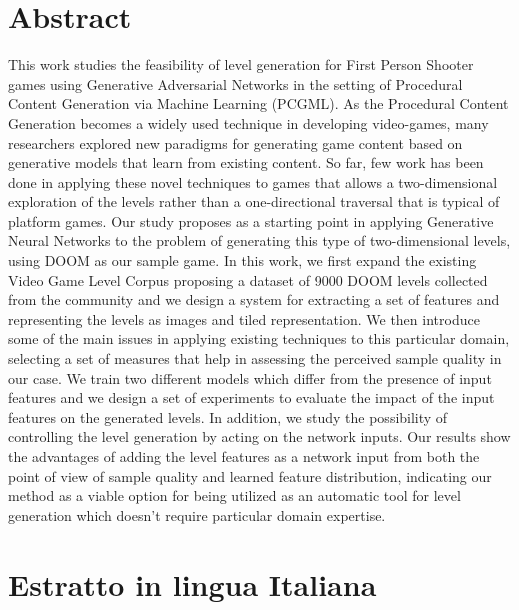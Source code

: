 \chapter*{Abstract}
%
This work studies the feasibility of level generation for First Person Shooter games using Generative Adversarial Networks in the setting of Procedural Content Generation via Machine Learning (PCGML).
As the Procedural Content Generation becomes a widely used technique in developing video-games, many researchers explored new paradigms for generating game content based on generative models that learn from existing content. So far, few work has been done in applying these novel techniques to games that allows a two-dimensional exploration of the levels rather than a one-directional traversal that is typical of platform games. Our study proposes as a starting point in applying Generative Neural Networks to the problem of generating this type of two-dimensional levels, using DOOM as our sample game. 
In this work, we first expand the existing Video Game Level Corpus proposing a dataset of 9000 DOOM levels collected from the community and we design a system for extracting a set of features and representing the levels as images and tiled representation. We then introduce some of the main issues in applying existing techniques to this particular domain, selecting a set of measures that help in assessing the perceived sample quality in our case. We train two different models which differ from the presence of input features and we design a set of experiments to evaluate the impact of the input features on the generated levels. In addition, we study the possibility of controlling the level generation by acting on the network inputs. Our results show the advantages of adding the level features as a network input from both the point of view of sample quality and learned feature distribution, indicating our method as a viable option for being utilized as an automatic tool for level generation which doesn't require particular domain expertise.

\chapter*{Estratto in lingua Italiana}

